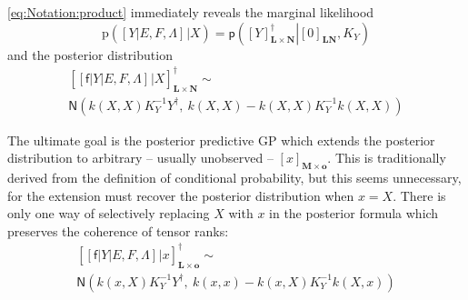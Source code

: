 \documentclass[preprint,12pt]{elsarticle}
\newcommand*{\M}[1]{\ensuremath{#1}\xspace}
\newcommand*{\x}{\times}
\newcommand*{\mi}[1]{\mathbf{#1}}
\newcommand*{\rv}[1]{\mathsf{#1}}
\newcommand*{\te}[2][]{\left\lbrack{#2}\right\rbrack_{#1}}
\newcommand*{\prob}[3]{\M{\mathsf{p}\!\left(\left.{#1}\right\vert{#2,#3}\right)}}
\newcommand*{\gauss}[2]{\mathsf{N}\!\left({#1,#2}\right)}
\begin{document}
            \cref{eq:Notation:product} immediately reveals the marginal likelihood
            \begin{equation} \label{eq:GP:marginalLikelihood}
                \mathrm{p}\!\left(\te{Y \vert E,F,\Lambda} \big\vert X\right)
                = \prob{\te[\mi{L\x N}]{Y}^{\dagger}}{\te[\mi{LN}]{0}}{K_Y}
            \end{equation}
            and the posterior distribution
            \begin{multline*}
                \te[\mi{L\x N}]{\te{\rv{f} \vert Y \vert E,F,\Lambda} \big\vert X}^{\dagger} \sim \\
                \gauss{k(X,X) K_{Y}^{-1} Y^{\dagger}}{\ k(X,X) - k(X,X) K_{Y}^{-1} k(X,X)}
            \end{multline*}

            The ultimate goal is the posterior predictive GP which extends the posterior distribution to arbitrary -- usually unobserved -- $\te[\mi{M}\x\mi{o}]{x}$. This is traditionally derived from the definition of conditional probability, but this seems unnecessary, for the extension must recover the posterior distribution when $x=X$. There is only one way of selectively replacing $X$ with $x$ in the posterior formula which preserves the coherence of tensor ranks:
            \begin{multline} \label{def:GP:Predictive}
               \te[\mi{L\x o}]{\te{\rv{f} \vert Y \vert E,F,\Lambda} \big\vert x}^{\dagger} \sim \\
               \gauss{k(x,X) K_{Y}^{-1} Y^{\dagger}}{\ k(x,x) - k(x,X) K_{Y}^{-1} k(X,x)}
            \end{multline}
    
\end{document}
